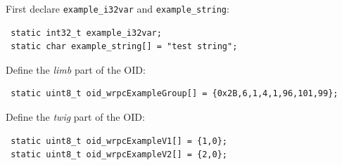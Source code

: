 \documentclass[a4paper, 12pt]{article}
\begin{document}
\begin{itemize*}
\item First declare \texttt{example\_i32var} and \texttt{example\_string}:
\begin{lstlisting}
 static int32_t example_i32var;
 static char example_string[] = "test string";
\end{lstlisting}

\item Define the \textit{limb} part of the OID:
\begin{lstlisting}
 static uint8_t oid_wrpcExampleGroup[] = {0x2B,6,1,4,1,96,101,99};
\end{lstlisting}

\item Define the \textit{twig} part of the OID:
\begin{lstlisting}
 static uint8_t oid_wrpcExampleV1[] = {1,0};
 static uint8_t oid_wrpcExampleV2[] = {2,0};
\end{lstlisting}


\end{itemize*}
\end{document}
